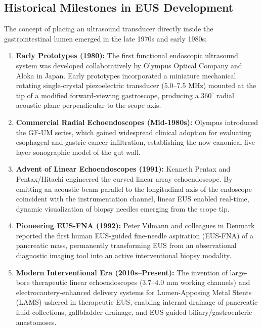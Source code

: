 \documentclass[11pt,a4paper]{article}
\begin{document}
\subsection{Historical Milestones in EUS Development}
The concept of placing an ultrasound transducer directly inside the gastrointestinal lumen emerged in the late 1970s and early 1980s:
\begin{enumerate}[leftmargin=2em]
    \item \textbf{Early Prototypes (1980):} The first functional endoscopic ultrasound system was developed collaboratively by Olympus Optical Company and Aloka in Japan. Early prototypes incorporated a miniature mechanical rotating single-crystal piezoelectric transducer ($5.0\text{--}7.5\text{ MHz}$) mounted at the tip of a modified forward-viewing gastroscope, producing a $360^\circ$ radial acoustic plane perpendicular to the scope axis.
    \item \textbf{Commercial Radial Echoendoscopes (Mid-1980s):} Olympus introduced the GF-UM series, which gained widespread clinical adoption for evaluating esophageal and gastric cancer infiltration, establishing the now-canonical five-layer sonographic model of the gut wall.
    \item \textbf{Advent of Linear Echoendoscopes (1991):} Kenneth Pentax and Pentax/Hitachi engineered the curved linear array echoendoscope. By emitting an acoustic beam parallel to the longitudinal axis of the endoscope coincident with the instrumentation channel, linear EUS enabled real-time, dynamic visualization of biopsy needles emerging from the scope tip.
    \item \textbf{Pioneering EUS-FNA (1992):} Peter Vilmann and colleagues in Denmark reported the first human EUS-guided fine-needle aspiration (EUS-FNA) of a pancreatic mass, permanently transforming EUS from an observational diagnostic imaging tool into an active interventional biopsy modality.
    \item \textbf{Modern Interventional Era (2010s--Present):} The invention of large-bore therapeutic linear echoendoscopes ($3.7\text{--}4.0\text{ mm}$ working channels) and electrocautery-enhanced delivery systems for Lumen-Apposing Metal Stents (LAMS) ushered in therapeutic EUS, enabling internal drainage of pancreatic fluid collections, gallbladder drainage, and EUS-guided biliary/gastroenteric anastomoses.
\end{enumerate}
\end{document}
